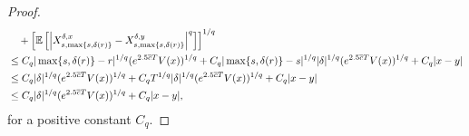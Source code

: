 \documentclass[11pt]{article}
\theoremstyle{theorem}
\theoremstyle{definition}
\newcommand{\1}{{\bf 1}}
\begin{document}
\begin{proof}
\begin{align}
& \quad + \left[\mathbb{E}\left[\left|X^{\delta, x}_{s,\max\{s, \delta(r)\}} - X^{\delta, y }_{s,\max\{s, \delta(r)\}}\right|^q\right]\right]^{1/q} \notag\\ 
& \leq C_q |\max\{s, \delta(r)\}-r|^{1/q} (e^{2.5\overline{c}T}V(x))^{1/q} + C_q |\max\{s, \delta(r)\}-s|^{1/q} |\delta|^{1/q} (e^{2.5\overline{c}T}V(x))^{1/q} + C_q |x-y| \notag\\
& \leq C_q |\delta|^{1/q} (e^{2.5\overline{c}T}V(x))^{1/q} + C_q T^{1/q} |\delta|^{1/q} (e^{2.5\overline{c}T}V(x))^{1/q} + C_q |x-y| \notag\\ 
& \leq C_q |\delta|^{1/q} (e^{2.5\overline{c}T}V(x))^{1/q} + C_q |x-y|,
\label{vm}
\end{align}
for a positive constant $C_q$.


\end{proof}
\end{document}
